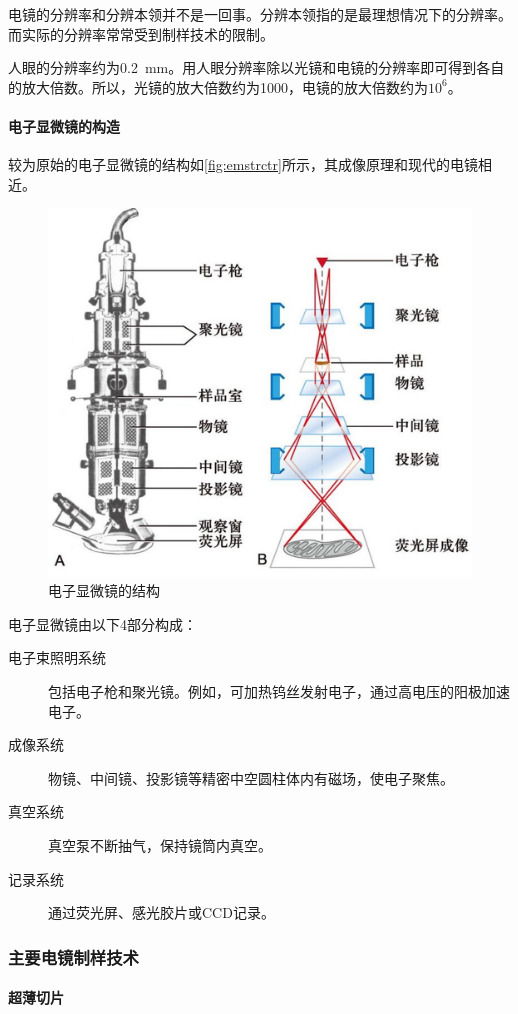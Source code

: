 电镜的分辨率和分辨本领并不是一回事。分辨本领指的是最理想情况下的分辨率。而实际的分辨率常常受到制样技术的限制。

人眼的分辨率约为\SI{0.2}{\mm}。用人眼分辨率除以光镜和电镜的分辨率即可得到各自的放大倍数。所以，光镜的放大倍数约为1000，电镜的放大倍数约为$10^6$。

\paragraph{电子显微镜的构造}

较为原始的电子显微镜的结构如\autoref{fig:emstrctr}所示，其成像原理和现代的电镜相近。

\begin{figure}[htbp]
	\centering
	\includegraphics[width=0.5\linewidth]{Pics/EM_strctr}
	\caption{电子显微镜的结构}
	\label{fig:emstrctr}
\end{figure}

电子显微镜由以下4部分构成：
\begin{description}
	\item[电子束照明系统] 包括电子枪和聚光镜。例如，可加热钨丝发射电子，通过高电压的阳极加速电子。
	\item[成像系统] 物镜、中间镜、投影镜等精密中空圆柱体内有磁场，使电子聚焦。
	\item[真空系统] 真空泵不断抽气，保持镜筒内真空。
	\item[记录系统] 通过荧光屏、感光胶片或CCD记录。
\end{description}

\subsubsection{主要电镜制样技术}

\paragraph{超薄切片}

